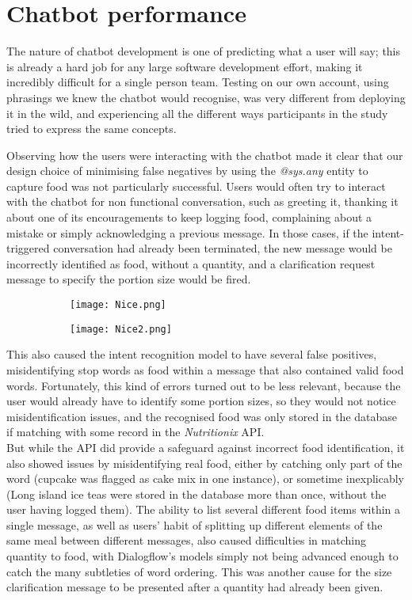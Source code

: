 \section{Chatbot performance}
The nature of chatbot development is one of predicting what a user will say; this is already a hard job for any large software development effort, making it incredibly difficult for a single person team.
Testing on our own account, using phrasings we knew the chatbot would recognise, was very different from deploying it in the wild, and experiencing all the different ways participants in the study tried to express the same concepts.

Observing how the users were interacting with the chatbot made it clear that our design choice of minimising false negatives by using the \textit{@sys.any} entity to capture food was not particularly successful. Users would often try to interact with the chatbot for non functional conversation, such as greeting it, thanking it about one of its encouragements to keep logging food, complaining about a mistake or simply acknowledging a previous message. In those cases, if the intent-triggered conversation had already been terminated, the new message would be incorrectly identified as food, without a quantity, and a clarification request message to specify the portion size would be fired. \\
\begin{figure}[h!]
  \centering
  \begin{subfigure}[b]{\linewidth}
    \texttt{[image: Nice.png]}
  \end{subfigure}
  \begin{subfigure}[b]{\linewidth}
    \texttt{[image: Nice2.png]}
  \end{subfigure}
\end{figure}
This also caused the intent recognition model to have several false positives, misidentifying stop words as food within a message that also contained valid food words. Fortunately, this kind of errors turned out to be less relevant, because the user would already have to identify some portion sizes, so they would not notice misidentification issues, and the recognised food was only stored in the database if matching with some record in the \textit{Nutritionix} API. \\
But while the API did provide a safeguard against incorrect food identification, it also showed issues by misidentifying real food, either by catching only part of the word (cupcake was flagged as cake mix in one instance), or sometime inexplicably (Long island ice teas were stored in the database more than once, without the user having logged them). The ability to list several different food items within a single message, as well as users' habit of splitting up different elements of the same meal between different messages, also caused difficulties in matching quantity to food, with Dialogflow's models simply not being advanced enough to catch the many subtleties of word ordering. This was another cause for the size clarification message to be presented after a quantity had already been given.

